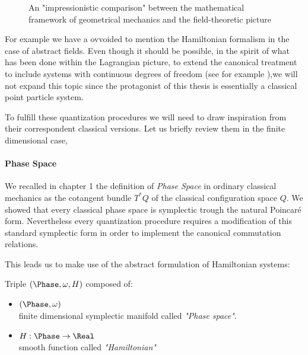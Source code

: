 \documentclass[Main]{subfiles}
\begin{document}
\begin{figure}[h!]
\begin{minipage}{0.45\textwidth}
		\end{minipage}
		\caption{An "impressionistic comparison"  between the mathematical framework of geometrical mechanics and  the field-theoretic picture}
		\end{figure}
	
	For example we have a ovvoided to mention the Hamiltonian formalism in the case of abstract fields.
	Even though it should be possible, in the spirit of what has been done within the Lagrangian picture, to extend the canonical treatment to include systems with continuous degrees of freedom (see for example \cite{Giachetta1999}),we will not expand this topic since the protagonist of this thesis is essentially a classical point particle system.
	
	To fulfill these quantization procedures we will need to draw inspiration from their correspondent classical versions.	Let us briefly review them in the finite dimensional case,
	
			\paragraph{Phase Space}
		We recalled in chapter 1 the definition of \emph{Phase Space} in ordinary classical mechanics as the cotangent bundle $T^*Q$ of the classical configuration space $Q$.
		We showed that every classical phase space is symplectic trough the natural Poincaré form.
		Nevertheless  every quantization procedure requires a modification of this standard symplectic form in order to implement the canonical commutation relations.
	
	This leads us to make use of the abstract formulation of Hamiltonian systems\cite{Abraham1978}:
	
	\begin{definition}
			Triple $(\Phase,\omega, H )$ composed of:
		\begin{itemize}
			\item $(\Phase,\omega)$ \\ finite dimensional symplectic manifold called \emph{"Phase space"}.
			\item	$ H :\Phase \rightarrow \Real$ \\  smooth function called \emph{"Hamiltonian"}
		\end{itemize}
	\end{definition}
	
\end{document}
